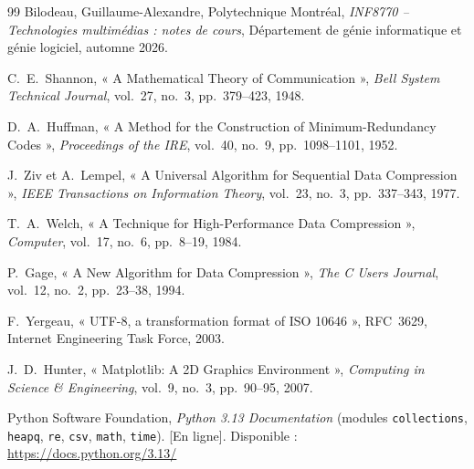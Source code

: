 \documentclass[12pt,letterpaper]{article}
\begin{document}
\begin{thebibliography}{99}
    Bilodeau, Guillaume-Alexandre, Polytechnique Montréal, \textit{INF8770 -- Technologies multimédias : notes de cours}, Département de génie informatique et génie logiciel, automne 2026.

    C.~E.~Shannon, « A Mathematical Theory of Communication », \textit{Bell System Technical Journal}, vol.~27, no.~3, pp.~379--423, 1948.

    D.~A.~Huffman, « A Method for the Construction of Minimum-Redundancy Codes », \textit{Proceedings of the IRE}, vol.~40, no.~9, pp.~1098--1101, 1952.

    J.~Ziv et A.~Lempel, « A Universal Algorithm for Sequential Data Compression », \textit{IEEE Transactions on Information Theory}, vol.~23, no.~3, pp.~337--343, 1977.

    T.~A.~Welch, « A Technique for High-Performance Data Compression », \textit{Computer}, vol.~17, no.~6, pp.~8--19, 1984.

    P.~Gage, « A New Algorithm for Data Compression », \textit{The C Users Journal}, vol.~12, no.~2, pp.~23--38, 1994.

    F.~Yergeau, « UTF-8, a transformation format of ISO 10646 », RFC~3629, Internet Engineering Task Force, 2003.

    J.~D.~Hunter, « Matplotlib: A 2D Graphics Environment », \textit{Computing in Science \& Engineering}, vol.~9, no.~3, pp.~90--95, 2007.

    Python Software Foundation, \textit{Python 3.13 Documentation} (modules \texttt{collections}, \texttt{heapq}, \texttt{re}, \texttt{csv}, \texttt{math}, \texttt{time}). [En ligne]. Disponible : \url{https://docs.python.org/3.13/}
\end{thebibliography}

\end{document}
